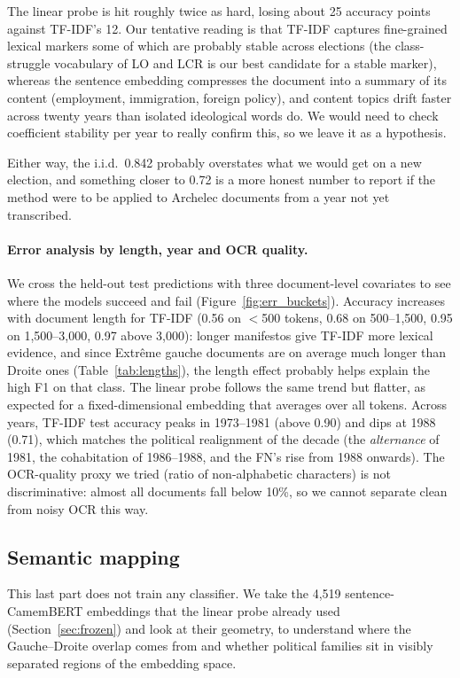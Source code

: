\documentclass{article}
\begin{document}
The linear probe is hit roughly twice as hard, losing about 25 accuracy points against TF-IDF's 12. Our tentative reading is that TF-IDF captures fine-grained lexical markers some of which are probably stable across elections (the class-struggle vocabulary of LO and LCR is our best candidate for a stable marker), whereas the sentence embedding compresses the document into a summary of its content (employment, immigration, foreign policy), and content topics drift faster across twenty years than isolated ideological words do. We would need to check coefficient stability per year to really confirm this, so we leave it as a hypothesis.

Either way, the i.i.d.\ 0.842 probably overstates what we would get on a new election, and something closer to 0.72 is a more honest number to report if the method were to be applied to Archelec documents from a year not yet transcribed.

\paragraph{Error analysis by length, year and OCR quality.}
We cross the held-out test predictions with three document-level covariates to see where the models succeed and fail (Figure~\ref{fig:err_buckets}). Accuracy increases with document length for TF-IDF (0.56 on $<$500 tokens, 0.68 on 500--1{,}500, 0.95 on 1{,}500--3{,}000, 0.97 above 3{,}000): longer manifestos give TF-IDF more lexical evidence, and since Extr\^{e}me gauche documents are on average much longer than Droite ones (Table~\ref{tab:lengths}), the length effect probably helps explain the high F1 on that class. The linear probe follows the same trend but flatter, as expected for a fixed-dimensional embedding that averages over all tokens. Across years, TF-IDF test accuracy peaks in 1973--1981 (above 0.90) and dips at 1988 (0.71), which matches the political realignment of the decade (the \textit{alternance} of 1981, the cohabitation of 1986--1988, and the FN's rise from 1988 onwards). The OCR-quality proxy we tried (ratio of non-alphabetic characters) is not discriminative: almost all documents fall below 10\%, so we cannot separate clean from noisy OCR this way.

\subsection{Semantic mapping}
\label{sec:mapping}

This last part does not train any classifier. We take the 4{,}519 sentence-CamemBERT embeddings that the linear probe already used (Section~\ref{sec:frozen}) and look at their geometry, to understand where the Gauche--Droite overlap comes from and whether political families sit in visibly separated regions of the embedding space.
\end{document}
